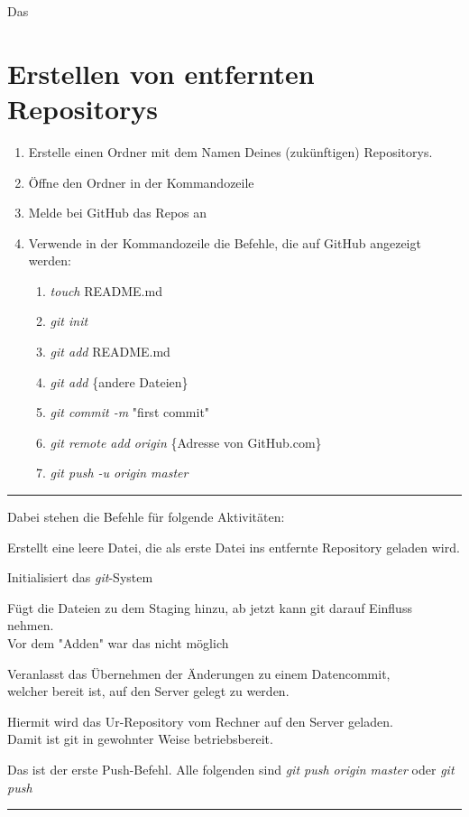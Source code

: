 Das

\newpage

\section{Erstellen von entfernten Repositorys}				%
\begin{enumerate}
	\item{Erstelle einen Ordner mit dem Namen Deines (zukünftigen) Repositorys.}
	\item{Öffne den Ordner in der Kommandozeile}
	\item{Melde bei GitHub das Repos an}
	\item{Verwende in der Kommandozeile die Befehle, die auf GitHub angezeigt werden:}
	\begin{enumerate}
		\item{\emph{touch} README.md}
		\item{\emph{git init}}
		\item{\emph{git add} README.md}
		\item{\emph{git add} \{andere Dateien\}}
		\item{\emph{git commit -m} "first commit"}
		\item{\emph{git remote add origin} \{Adresse von GitHub.com\}}
		\item{\emph{git push -u origin master}}
	\end{enumerate}
\end{enumerate}
\hrule 
\vspace{3pt}
Dabei stehen die Befehle  für folgende Aktivitäten:
\begin{description}[leftmargin=\parindent,labelsep=8pt]
	\item[a] Erstellt eine leere Datei, die als erste Datei ins entfernte Repository geladen wird.
	\item[b] Initialisiert das \emph{git}-System
	\item[c] Fügt die Dateien zu dem Staging hinzu, ab jetzt kann git darauf Einfluss nehmen. \\ \phantom{} Vor dem "Adden" war das nicht möglich
	\item[d] Veranlasst das Übernehmen der Änderungen zu einem Datencommit,\\ \phantom{} welcher bereit ist, auf den Server gelegt zu werden.
	\item[e]  Hiermit wird das Ur-Repository vom Rechner auf den Server geladen.\\ \phantom{} Damit ist git in gewohnter Weise betriebsbereit.
	\item[f] Das ist der erste Push-Befehl. Alle folgenden sind \emph{git push origin master} oder \emph{git push}
\end{description}
\hrule 
\vspace{3pt}
